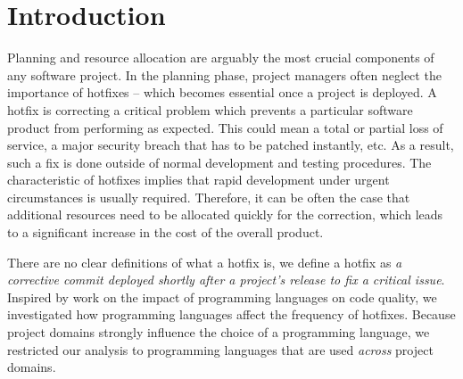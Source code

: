 \documentclass{sig-alternate}
\begin{document}
\section{Introduction}
Planning and resource allocation are arguably the most crucial components of any software project. In the planning phase, project managers often neglect the importance of hotfixes -- which becomes essential once a project is deployed.  A hotfix is correcting a critical problem which prevents a particular software product from performing as expected. This could mean a total or partial loss of service, a major security breach that has to be patched instantly, etc. As a result, such a fix is done outside of normal development and testing procedures. The characteristic of hotfixes implies that rapid development under urgent circumstances is usually required. Therefore, it can be often the case that additional resources need to be allocated quickly for the correction, which leads to a significant increase in the cost of the overall product.


There are no clear definitions of what a hotfix is, we define a hotfix as \emph{a corrective commit deployed shortly after a project's release to fix a critical issue}. Inspired by work on the impact of programming languages on code quality, we investigated how programming languages affect the frequency of hotfixes. Because project domains strongly influence the choice of a programming language, we restricted our analysis to programming languages that are used \emph{across} project domains.


\end{document}
